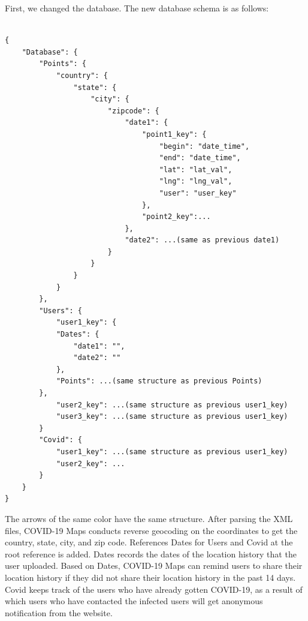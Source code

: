 \documentclass{ucsdreport}
\begin{document}
First, we changed the database. The new database schema is as follows:

\begin{verbatim}

{
    "Database": {
        "Points": {
            "country": {
                "state": {
                    "city": {
                        "zipcode": {
                            "date1": {
                                "point1_key": {
                                    "begin": "date_time",
                                    "end": "date_time",
                                    "lat": "lat_val",
                                    "lng": "lng_val",
                                    "user": "user_key"
                                },
                                "point2_key":...
                            },
                            "date2": ...(same as previous date1)
                        }
                    }
                }
            }
        },
        "Users": {
            "user1_key": {
            "Dates": {
                "date1": "",
                "date2": ""
            },
            "Points": ...(same structure as previous Points)
        },
            "user2_key": ...(same structure as previous user1_key) 
            "user3_key": ...(same structure as previous user1_key) 
        }
        "Covid": {
            "user1_key": ...(same structure as previous user1_key)
            "user2_key": ...
        }
    }
}

\end{verbatim}

The arrows of the same color have the same structure. After parsing the XML 
files, COVID-19 Maps conducts reverse geocoding on the coordinates to get the 
country, state, city, and zip code. References Dates for Users and Covid at the
root reference is added. Dates records the dates of the location history that 
the user uploaded. Based on Dates, COVID-19 Maps can remind users to share 
their location history if they did not share their location history in the past
14 days. Covid keeps track of the users who have already gotten COVID-19, as a 
result of which users who have contacted the infected users will get anonymous 
notification from the website.
\end{document}
